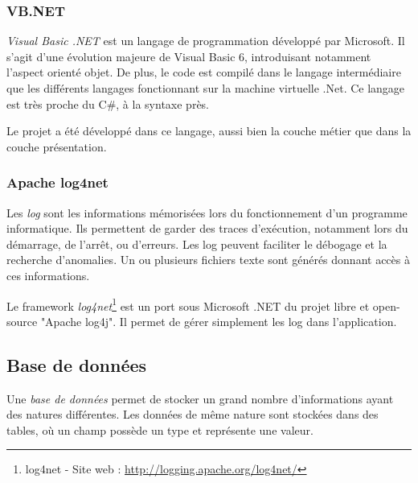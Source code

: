 
\subsubsection{VB.NET}

\textit{Visual Basic .NET} est un langage de programmation développé par Microsoft.
Il s'agit d'une évolution majeure de Visual Basic 6, introduisant notamment l'aspect orienté objet.
De plus, le code est compilé dans le langage intermédiaire que les différents langages fonctionnant sur la machine virtuelle .Net.
Ce langage est très proche du C\#, à la syntaxe près.

Le projet a été développé dans ce langage, aussi bien la couche métier que dans la couche présentation.


\subsubsection{Apache log4net}


Les \textit{log} sont les informations mémorisées lors du fonctionnement d'un programme informatique.
Ils permettent de garder des traces d'exécution, notamment lors du démarrage, de l'arrêt, ou d'erreurs.
Les log peuvent faciliter le débogage et la recherche d'anomalies.
Un ou plusieurs fichiers texte sont générés donnant accès à ces informations.

Le framework \textit{log4net}\footnote{log4net - Site web : \url{http://logging.apache.org/log4net/}} est un port sous Microsoft .NET du projet libre et open-source "Apache log4j".
Il permet de gérer simplement les log dans l'application.


\subsection{Base de données}

Une \textit{base de données} permet de stocker un grand nombre d'informations ayant des natures différentes.
Les données de même nature sont stockées dans des tables, où un champ possède un type et représente une valeur.

